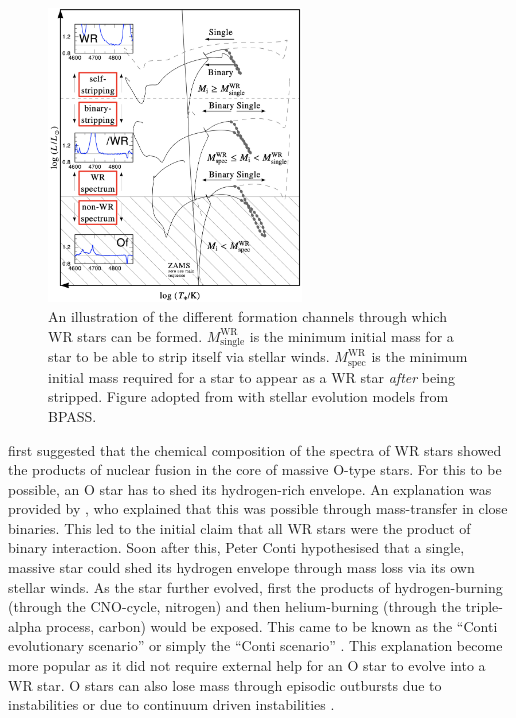 \begin{figure}
    \centering
    \includegraphics[width=0.6\textwidth]{chapters/introduction/image/FormationChannels.png}
    \caption{An illustration of the different formation channels through which WR stars can be formed. $M^{\textrm{WR}}_{\textrm{single}}$ is the minimum initial mass for a star to be able to strip itself via stellar winds. $M^{\textrm{WR}}_{\textrm{spec}}$ is the minimum initial mass required for a star to appear as a WR star \textit{after} being stripped. Figure adopted from \citet{shenar_why_2020} with stellar evolution models from BPASS.}
    \label{fig:formation_wr}
\end{figure}

\citet{gamow_wc_1943} first suggested that the chemical composition of the spectra of WR stars showed the products of nuclear fusion in the core of massive O-type stars. For this to be possible, an O star has to shed its hydrogen-rich envelope. An explanation was provided by \citet{paczynski_evolution_1967}, who explained that this was possible through mass-transfer in close binaries. This led to the initial claim that all WR stars were the product of binary interaction. Soon after this, Peter Conti hypothesised that a single, massive star could shed its hydrogen envelope through mass loss via its own stellar winds. As the star further evolved, first the products of hydrogen-burning (through the CNO-cycle, nitrogen) and then helium-burning (through the triple-alpha process, carbon) would be exposed. This came to be known as the ``Conti evolutionary scenario'' or simply the ``Conti scenario'' \citep{1976Conti}. This explanation become more popular as it did not require external help for an O star to evolve into a WR star. O stars can also lose mass through episodic outbursts due to instabilities \citep[e.g.][]{langer_towards_1994} or due to continuum driven instabilities \citep{smith_role_2006}.

